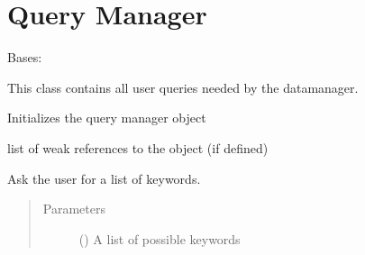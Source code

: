\documentclass[letterpaper,10pt,english]{sphinxmanual}
\begin{document}
\chapter{Query Manager}
\label{\detokenize{dc_query_manager:query-manager}}\label{\detokenize{dc_query_manager::doc}}\label{\detokenize{dc_query_manager:module-src.query_manager}}

\begin{fulllineitems}
\label{\detokenize{dc_query_manager:src.query_manager.QueryManager}}
\sphinxAtStartPar
Bases: 

\sphinxAtStartPar
This class contains all user queries needed by the datamanager.

\begin{fulllineitems}
\label{\detokenize{dc_query_manager:src.query_manager.QueryManager.__init__}}
\sphinxAtStartPar
Initializes the query manager object

\end{fulllineitems}


\begin{fulllineitems}
\label{\detokenize{dc_query_manager:src.query_manager.QueryManager.__weakref__}}
\sphinxAtStartPar
list of weak references to the object (if defined)

\end{fulllineitems}


\begin{fulllineitems}
\label{\detokenize{dc_query_manager:src.query_manager.QueryManager.ask_keywords}}
\sphinxAtStartPar
Ask the user for a list of keywords.
\begin{quote}\begin{description}
\item[{Parameters}] \leavevmode
\sphinxAtStartPar
{} () \textendash{} A list of possible keywords


\end{description}
\end{quote}
\end{fulllineitems}
\end{fulllineitems}
\end{document}
